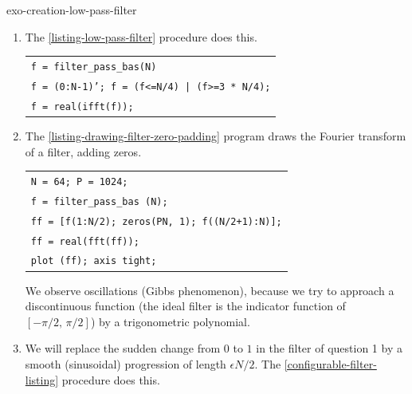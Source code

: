  
\begin{correction}{exo-creation-low-pass-filter}
\begin{enumerate}
\item The \Matlab{} \ref{listing-low-pass-filter} procedure does this.

\begin{listing} \begin{footnotesize}
{\upshape
\begin{tabular}{l} \texttt{\pfunction f = filter\_pass\_bas(N)} \\
\texttt{f = (0:N-1)'; f = (f<=N/4) | (f>=3 * N/4);} \\
\texttt{f = real(ifft(f));} \\
\end{tabular}
}
\end{footnotesize}
\caption{Procedure \texttt{\upshape filter\_pass\_bas}}
\label{listing-low-pass-filter}
\end{listing}
 
\item {}  The \Matlab{} \ref{listing-drawing-filter-zero-padding} program draws the Fourier transform of a filter, adding zeros.

\begin{listing} \begin{footnotesize} 
{\upshape
\begin{tabular}{l} \texttt{N = 64; P = 1024;} \\
\texttt{f = filter\_pass\_bas (N);} \\
\texttt{ff = [f(1:N/2); zeros(PN, 1); f((N/2+1):N)];} \\
\texttt{ff = real(fft(ff));} \\
\texttt{plot (ff); axis tight;} \\
\end{tabular}
}
\end{footnotesize}
\caption{Drawing the continuous Fourier transform by zero padding}
\label{listing-drawing-filter-zero-padding}
\end{listing}

We observe oscillations (Gibbs phenomenon), because we try to approach a discontinuous function (the ideal filter is the indicator function of $ [- \pi/2, \, \pi/2] $) by a trigonometric polynomial.
\item We will replace the sudden change from $ 0 $ to $ 1 $ in the filter of question 1 by a smooth (sinusoidal) progression of length $ \epsilon N/2 $. The \ref{configurable-filter-listing} procedure does this.


\end{enumerate}
\end{correction}
